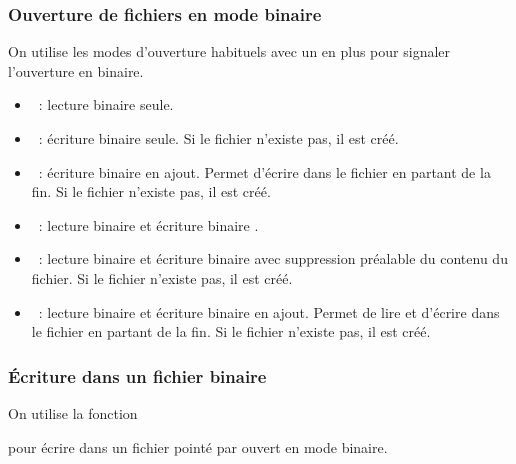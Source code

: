 \begin{frame} \frametitle{Ouverture de fichiers en mode binaire}
On utilise les modes d'ouverture habituels avec un  en plus
pour signaler l'ouverture en binaire.
\smallskip

\begin{itemize}
    \item {}~: lecture binaire seule.
    \medskip

    \item {}~: écriture binaire seule. Si le fichier n'existe
    pas, il est créé.
    \medskip

    \item {}~: écriture binaire en ajout. Permet d'écrire dans le fichier
    en partant de la fin. Si le fichier n'existe pas, il est créé.
    \medskip

    \item {}~: lecture binaire  et écriture binaire .
    \medskip

    \item {}~: lecture binaire et écriture binaire
    avec suppression préalable
    du contenu du fichier. Si le fichier n'existe pas, il est créé.
    \medskip

    \item {}~: lecture binaire et écriture binaire en ajout. Permet de lire et
    d'écrire dans le fichier en partant de la fin. Si le fichier
    n'existe pas, il est créé.
\end{itemize}
\end{frame}

\begin{frame} \frametitle{Écriture dans un fichier binaire}
On utilise la fonction
\begin{center}
\end{center}
pour \alert{écrire} dans un fichier pointé par  ouvert
en \alert{mode binaire}.
\bigskip


\end{frame}

